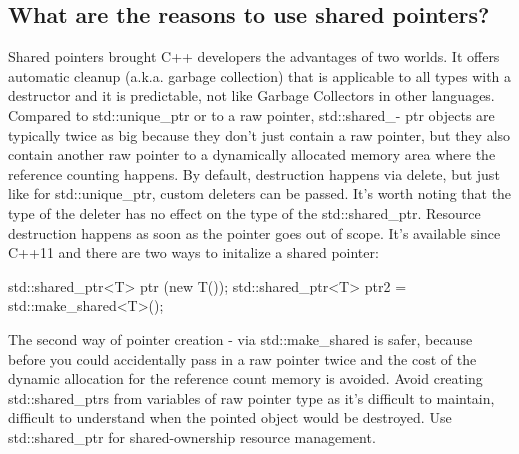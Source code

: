 \documentclass{report}
\begin{document}
\bigbreak \noindent 
\subsection{What are the reasons to use shared pointers?}
\bigbreak \noindent 
Shared pointers brought C++ developers the advantages of two
worlds. It offers automatic cleanup (a.k.a. garbage collection) that
is applicable to all types with a destructor and it is predictable, not
like Garbage Collectors in other languages.
\bigbreak \noindent 
Compared to std::unique\_ptr or to a raw pointer, std::shared\_-
ptr objects are typically twice as big because they don’t just contain
a raw pointer, but they also contain another raw pointer to a
dynamically allocated memory area where the reference counting
happens.
\bigbreak \noindent 
By default, destruction happens via delete, but just like for
std::unique\_ptr, custom deleters can be passed. It’s worth noting
that the type of the deleter has no effect on the type of the
std::shared\_ptr.
\bigbreak \noindent 
Resource destruction happens as soon as the pointer goes out of
scope.
\bigbreak \noindent 
It’s available since C++11 and there are two ways to initalize a
shared pointer:
\bigbreak \noindent 
\begin{cppcode}
std::shared_ptr<T> ptr (new T());
std::shared_ptr<T> ptr2 = std::make_shared<T>();
\end{cppcode}
\bigbreak \noindent 
The second way of pointer creation - via std::make\_shared is safer,
because before you could accidentally pass in a raw pointer twice
and the cost of the dynamic allocation for the reference count
memory is avoided.
\bigbreak \noindent 
Avoid creating std::shared\_ptrs from variables of raw pointer
type as it’s difficult to maintain, difficult to understand when the
pointed object would be destroyed.
\bigbreak \noindent 
Use std::shared\_ptr for shared-ownership resource management.

\bigbreak \noindent 
\end{document}
